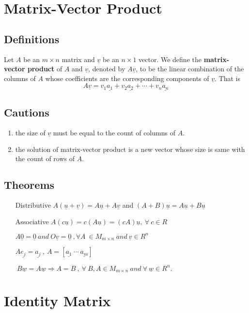 \documentclass[12pt]{article}
\begin{document}
\section{Matrix-Vector Product}
\subsection{Definitions}
Let $A$ be an $m \times n$ matrix and $\underline{v}$ be an $n \times 1$ vector. We define the \textbf{matrix-vector product} of $A$ and $\underline{v}$, denoted by $A\underline{v}$, to be the linear combination of the columns of $A$ whose coefficients are the corresponding components of $\underline{v}$. That is 
$$A\underline{v} = v_1\underline{a_1} + v_2\underline{a_2} + \cdots + v_n\underline{a_n}$$
\subsection{Cautions}
\begin{enumerate}
\item the size of $\underline{v}$ must be equal to the count of columns of $A$.
\item the solution of matrix-vector product is a new vector whose size is same with the count of rows of $A$.
\end{enumerate}
\subsection{Theorems}
\begin{enumerate}
\item[Distributive] $A(\underline{u}+\underline{v})=A\underline{u}+A\underline{v}$ and $(A+B)\underline{u}=A\underline{u}+B\underline{u}$
\item[Associative] $A(c\underline{u})=c(A\underline{u})=(cA)\underline{u},\ \forall\ c \in R$
\item[] $A\underline{0}=\underline{0}\ and\ O\underline{v}=\underline{0}\ , \forall A\ \in M_{m \times n}\ and\ \underline{v} \in R^n$
\item[] $A\underline{e_j} = \underline{a_j}\ ,\ A = [\underline{a_1}\ \cdots\ \underline{a_m}]$
\item[] $\ B\underline{w}=A\underline{w} \Rightarrow A=B\ ,\ \forall\ B,A \in M_{m \times n}\ and\ \forall\ \underline{w} \in R^n.$ 
\end{enumerate}

\section{Identity Matrix}
\end{document}
